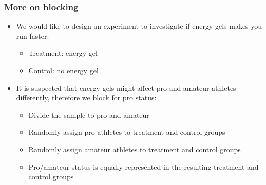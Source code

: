 \documentclass[slidestop,compress,mathserif]{beamer}
\begin{document}

\begin{frame}
	\frametitle{More on blocking}

	{
	\begin{center}
	\end{center}
	}
	{
	\begin{itemize}
		\item We would like to design an experiment to investigate if energy gels makes you run faster:
		\pause
		\begin{itemize}
			\item Treatment: energy gel
			\item Control: no energy gel
		\end{itemize}
		\pause
		\item It is suspected that energy gels might affect pro and amateur athletes differently, therefore we block for pro status:
		\pause
		\begin{itemize}
			\item Divide the sample to pro and amateur
			\item Randomly assign pro athletes to treatment and control groups
			\item Randomly assign amateur athletes to treatment and control groups
			\item Pro/amateur status is equally represented in the resulting treatment and control groups
		\end{itemize}
	\end{itemize}
	}

	\pause

\end{frame}




\end{document}

